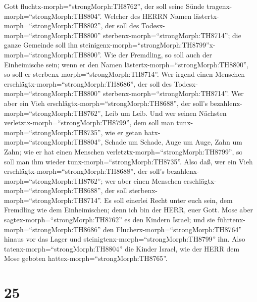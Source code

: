Gott fluchtx-morph=``strongMorph:TH8762'', der soll seine Sünde
tragenx-morph=``strongMorph:TH8804''.  Welcher des HERRN
Namen lästertx-morph=``strongMorph:TH8802'', der soll des
Todesx-morph=``strongMorph:TH8800''
sterbenx-morph=``strongMorph:TH8714''; die ganze Gemeinde soll ihn
steinigenx-morph=``strongMorph:TH8799''x-morph=``strongMorph:TH8800''.
Wie der Fremdling, so soll auch der Einheimische sein; wenn er den Namen
lästertx-morph=``strongMorph:TH8800'', so soll er
sterbenx-morph=``strongMorph:TH8714''.  Wer irgend einen
Menschen erschlägtx-morph=``strongMorph:TH8686'', der soll des
Todesx-morph=``strongMorph:TH8800''
sterbenx-morph=``strongMorph:TH8714''.  Wer aber ein Vieh
erschlägtx-morph=``strongMorph:TH8688'', der soll's
bezahlenx-morph=``strongMorph:TH8762'', Leib um Leib.  Und
wer seinen Nächsten verletztx-morph=``strongMorph:TH8799'', dem soll man
tunx-morph=``strongMorph:TH8735'', wie er getan
hatx-morph=``strongMorph:TH8804'',  Schade um Schade, Auge
um Auge, Zahn um Zahn; wie er hat einen Menschen
verletztx-morph=``strongMorph:TH8799'', so soll man ihm wieder
tunx-morph=``strongMorph:TH8735''.  Also daß, wer ein Vieh
erschlägtx-morph=``strongMorph:TH8688'', der soll's
bezahlenx-morph=``strongMorph:TH8762''; wer aber einen Menschen
erschlägtx-morph=``strongMorph:TH8688'', der soll
sterbenx-morph=``strongMorph:TH8714''.  Es soll einerlei
Recht unter euch sein, dem Fremdling wie dem Einheimischen; denn ich bin
der HERR, euer Gott.  Mose aber
sagtex-morph=``strongMorph:TH8762'' es den Kindern Israel; und sie
führtenx-morph=``strongMorph:TH8686'' den
Flucherx-morph=``strongMorph:TH8764'' hinaus vor das Lager und
steinigtenx-morph=``strongMorph:TH8799'' ihn. Also
tatenx-morph=``strongMorph:TH8804'' die Kinder Israel, wie der HERR dem
Mose geboten hattex-morph=``strongMorph:TH8765''.

\hypertarget{section-24}{%
\section{25}\label{section-24}}

